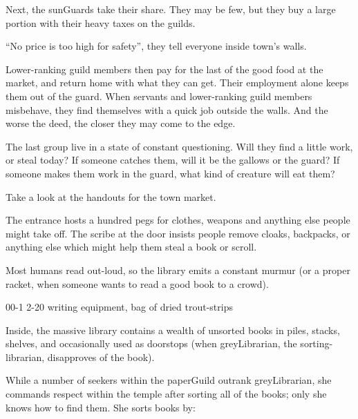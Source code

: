 \begin{multicols}{2}
Next, the \glspl{sunGuard} take their share.
They may be few, but they buy a large portion with their heavy taxes on the guilds.

``No price is too high for safety'', they tell everyone inside \gls{town}'s walls.

Lower-ranking guild members then pay for the last of the good food at the market, and return home with what they can get.
Their employment alone keeps them out of the \gls{guard}.
When servants and lower-ranking guild members misbehave, they find themselves with a quick job outside the walls.
And the worse the deed, the closer they may come to the \gls{edge}.

The last group live in a state of constant questioning.
Will they find a little work, or steal today?
If someone catches them, will it be the gallows or the guard?
If someone makes them work in the \gls{guard}, what kind of creature will eat them?

Take a look at the handouts for the \gls{town} market.


The entrance hosts a hundred pegs for clothes, weapons and anything else people might take off.
The \gls{scribe} at the door insists people remove cloaks, backpacks, or anything else which might help them steal a book or scroll.

Most humans read out-loud, so the library emits a constant murmur (or a proper racket, when someone wants to read a good book to a crowd).

%
  {{0}{0}{-1}}%
  {{2}{-2}{0}}%
  {
    \setcounter{Academics}{3}
    \setcounter{Crafts}{1}
    \setcounter{Empathy}{1}
  }%
  {%
  }%
  {writing equipment, bag of dried trout-strips}%
  {}%

Inside, the massive library contains a wealth of unsorted books in piles, stacks, shelves, and occasionally used as doorstops (when \gls{greyLibrarian}, the sorting-librarian, disapproves of the book).

While a number of \glspl{seeker} within the \gls{paperGuild} outrank \gls{greyLibrarian}, she commands respect within the temple after sorting all of the books; only she knows how to find them.
She sorts books by:


\end{multicols}
